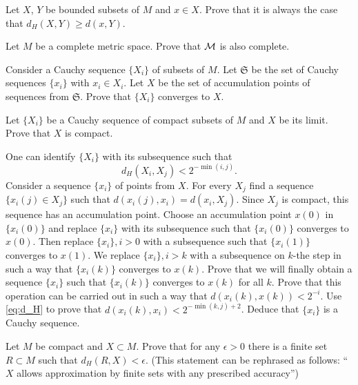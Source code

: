 \documentclass[12pt]{article}
\begin{document}
\begin{zadacha} Let $X$, $Y$ be bounded subsets of $M$
and $x\in X$. Prove that it is always the case that $d_{H}(X, Y) \geq
d(x, Y)$.
\end{zadacha}

\begin{zadacha}[!] Let $M$ be a complete metric space. Prove 
that $\cal M$ is also complete. 
\end{zadacha}

\begin{ukazanie} Consider a Cauchy sequence $\{ X_i\}$ of subsets of $M$.
  Let $\mathfrak S$ be the set of Cauchy sequences $\{x_i\}$ with 
$x_i \in X_i$. Let $X$ be the set of accumulation points of sequences
  from $\mathfrak S$. Prove that $\{X_i\}$ converges to $X$.
\end{ukazanie}

\begin{zadacha}[*] Let $\{ X_i\}$ be a Cauchy sequence of compact
  subsets of $M$ and $X$ be its limit. Prove that $X$
is compact.
\end{zadacha}

\begin{ukazanie} One can identify $\{X_i\}$ with its subsequence such
  that \begin{equation}\label{eq:d_H}
d_H(X_i, X_j)< 2^{-\min(i,j)}.
\end{equation}  Consider a sequence 
$\{x_i\}$ of points from  $X$. For every $X_j$ find a sequence 
 $\{x_i(j)\in X_j\}$ such  that $d(x_i(j), x_i)= d(x_i, X_j)$. Since $X_j$
 is compact, this sequence has an accumulation point. Choose an
 accumulation point $x(0)$ in $\{x_i(0)\}$ and replace $\{x_i\}$ with
 its subsequence such that $\{x_i(0)\}$ converges to $x(0)$. Then
 replace $\{x_i\}, i>0$ with a subsequence such that
$\{x_i(1)\}$ converges to $x(1)$.  We replace $\{x_i\},
i>k$ with a subsequence on $k$-the step in such a way that
$\{x_i(k)\}$ converges  to $x(k)$. Prove that we will finally obtain a
sequence $\{x_i\}$ such that $\{x_i(k)\}$ converges to $x(k)$  for all
$k$. Prove that this operation can be carried out in such a way that
$d(x_i(k), x(k)) < 2^{-i}$. Use \eqref{eq:d_H}
to prove that $d(x_i(k), x_i)<
2^{-\min(k,j)+2}$. Deduce that $\{x_i\}$ is a Cauchy sequence.
\end{ukazanie}

\begin{zadacha}[!] Let $M$ be compact and $X\subset M$.
  Prove that for any  $\epsilon >0$ there is a finite
  set $R\subset M$ such that $d_H(R, X)<\epsilon$. 
(This statement can be rephrased as follows: ``$X$ allows approximation
by finite sets with any prescribed accuracy'')
\end{zadacha}
\end{document}
